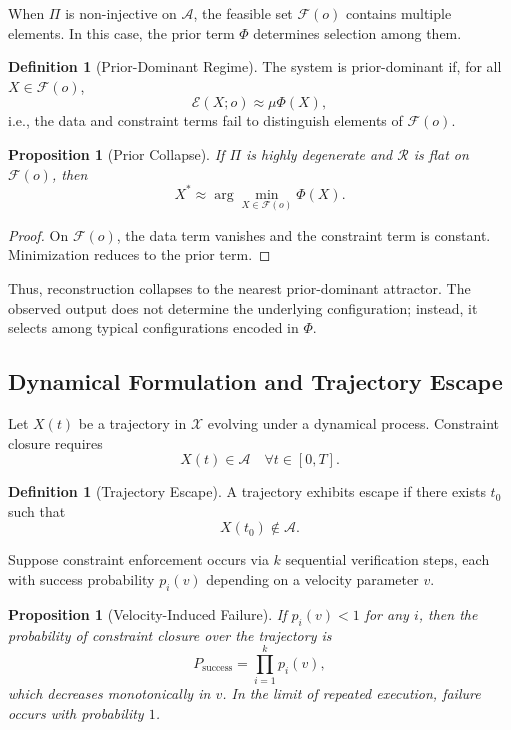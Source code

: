 \documentclass[12pt, oneside]{article}
\theoremstyle{plain}
\newtheorem{proposition}[theorem]{Proposition}
\theoremstyle{definition}
\newtheorem{definition}[theorem]{Definition}
\theoremstyle{remark}
\begin{document}
When $\Pi$ is non-injective on $\mathcal{A}$, the feasible set $\mathcal{F}(o)$ contains multiple elements. In this case, the prior term $\Phi$ determines selection among them.

\begin{definition}[Prior-Dominant Regime]
The system is prior-dominant if, for all $X \in \mathcal{F}(o)$,
\[
\mathcal{E}(X; o) \approx \mu \Phi(X),
\]
i.e., the data and constraint terms fail to distinguish elements of $\mathcal{F}(o)$.
\end{definition}

\begin{proposition}[Prior Collapse]
If $\Pi$ is highly degenerate and $\mathcal{R}$ is flat on $\mathcal{F}(o)$, then
\[
X^* \approx \arg\min_{X \in \mathcal{F}(o)} \Phi(X).
\]
\end{proposition}

\begin{proof}
On $\mathcal{F}(o)$, the data term vanishes and the constraint term is constant. Minimization reduces to the prior term.
\end{proof}

Thus, reconstruction collapses to the nearest prior-dominant attractor. The observed output does not determine the underlying configuration; instead, it selects among typical configurations encoded in $\Phi$.

\subsection{Dynamical Formulation and Trajectory Escape}

Let $X(t)$ be a trajectory in $\mathcal{X}$ evolving under a dynamical process. Constraint closure requires
\[
X(t) \in \mathcal{A} \quad \forall t \in [0,T].
\]

\begin{definition}[Trajectory Escape]
A trajectory exhibits escape if there exists $t_0$ such that
\[
X(t_0) \notin \mathcal{A}.
\]
\end{definition}

Suppose constraint enforcement occurs via $k$ sequential verification steps, each with success probability $p_i(v)$ depending on a velocity parameter $v$.

\begin{proposition}[Velocity-Induced Failure]
If $p_i(v) < 1$ for any $i$, then the probability of constraint closure over the trajectory is
\[
P_{\text{success}} = \prod_{i=1}^k p_i(v),
\]
which decreases monotonically in $v$. In the limit of repeated execution, failure occurs with probability $1$.
\end{proposition}
\end{document}

